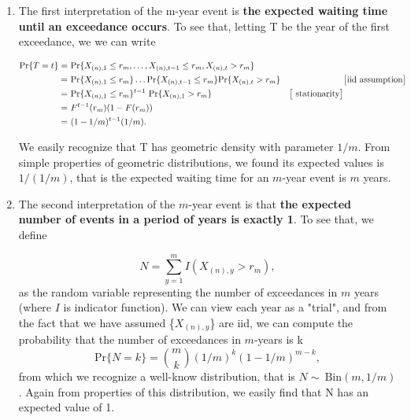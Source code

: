 \begin{enumerate}
	\item The first interpretation of the m-year event is \textbf{the expected waiting time until an exceedance occurs}. To see that, letting T be the year of the first exceedance, we we can write
	
	\begin{equation}
	\begin{aligned}
	\text{Pr}\{T=t\}=\  & \text{Pr}\{X_{(n),1}\leq r_m,\dots,X_{(n),t-1}\leq r_m,X_{(n),t}>r_m\} \\
	=\ & \text{Pr}\{X_{(n),1}\leq r_m\}\dots\text{Pr}\{X_{(n),t-1}\leq r_m\}\text{Pr}\{X_{(n),t}>r_m\}& & \big[ \textnormal{iid assumption}\big]\\
	= \ & \text{Pr}\{X_{(n),1}\leq r_m\}^{t-1}\ \text{Pr}\{X_{(n),1}>r_m\} &  \big[ \text{ stationarity}\big]\\
	=\ & F^{t-1}(r_m)(1-F(r_m))\\
	=\ & (1-1/m)^{t-1}(1/m).
	\end{aligned}
	\end{equation}
	
	
	We easily recognize that T has geometric density with parameter $1/m$. From simple properties of geometric distributions, we found its expected values is $1/(1/m)$, that is the expected waiting time for an $m$-year event is $m$ years.
	
	\item The second interpretation of the $m$-year event is that \textbf{the expected number of events in a period of  years is exactly 1}. To see that, we define  
	
	\begin{equation*}N=\sum_{y=1}^m I(X_{(n),y}>r_m),
	\end{equation*}
	as the random variable representing the number of exceedances in $m$ years (where $I$ is indicator function). We can view each year as a "trial", and from the fact that we have assumed \big\{$X_{(n),y}$\big\} are iid, we can compute the probability that the number of exceedances in $m$-years is k
	\begin{equation*}
	\text{Pr}\{N=k\}=\binom{m}{k}(1/m)^k(1-1/m)^{m-k},
	\end{equation*}
	from which we recognize a well-know distribution, that is $N\sim \ \text{Bin}(m,1/m)$. Again from properties of this distribution, we easily find that N has an expected value of 1.
	
\end{enumerate}


